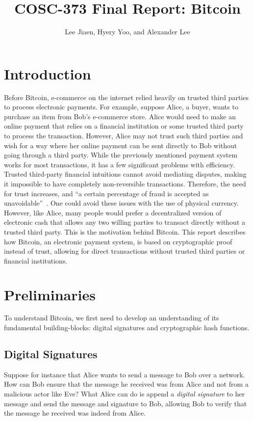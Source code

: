 \documentclass{article}
\title{COSC-373 Final Report: Bitcoin}
\author{Lee Jiaen, Hyery Yoo, and Alexander Lee}
\begin{document}
\maketitle

\section{Introduction}

Before Bitcoin, e-commerce on the internet relied heavily on trusted third
parties to process electronic payments. For example, suppose Alice, a buyer,
wants to purchase an item from Bob's e-commerce store. Alice would need to make
an online payment that relies on a financial institution or some trusted third
party to process the transaction. However, Alice may not trust such third
parties and wish for a way where her online payment can be sent directly to
Bob without going through a third party. While the previously mentioned payment
system works for most transactions, it has a few significant problems with
efficiency. Trusted third-party financial intuitions cannot avoid mediating
disputes, making it impossible to have completely non-reversible transactions.
Therefore, the need for trust increases, and ``a certain percentage of fraud is
accepted as unavoidable''~\citep{Nakamoto08}. One could avoid these issues with
the use of physical currency. However, like Alice, many people would prefer a
decentralized version of electronic cash that allows any two willing parties to
transact directly without a trusted third party. This is the motivation behind
Bitcoin. This report describes how Bitcoin, an electronic payment system, is
based on cryptographic proof instead of trust, allowing for direct transactions
without trusted third parties or financial institutions.

\section{Preliminaries}

To understand Bitcoin, we first need to develop an understanding of its
fundamental building-blocks: digital signatures and cryptographic hash
functions.

\subsection{Digital Signatures}

Suppose for instance that Alice wants to send a message to Bob over a network.
How can Bob ensure that the message he received was from Alice and not from a
malicious actor like Eve? What Alice can do is append a \emph{digital signature}
to her message and send the message and signature to Bob, allowing Bob to verify
that the message he received was indeed from Alice.
\end{document}
